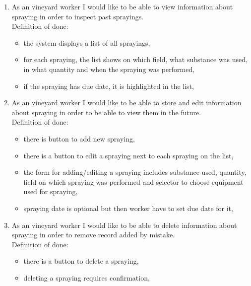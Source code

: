 \begin{enumerate}
	\begin{itemize}
		\item on task list there is button to mark task as completed or not completed,
	\end{itemize}
	\item As an vineyard worker I would like to be able to view information about spraying in order to inspect past sprayings. \\Definition of done:
	\begin{itemize}
		\item the system displays a list of all sprayings,
		\item for each spraying, the list shows on which field, what substance was used, in what quantity and when the spraying was performed,
		\item if the spraying has due date, it is highlighted in the list,
	\end{itemize}
	\item As an vineyard worker I would like to be able to store and edit information about spraying in order to be able to view them in the future. \\Definition of done:
	\begin{itemize}
		\item there is button to add new spraying,
		\item there is a button to edit a spraying next to each spraying on the list,
		\item the form for adding/editing a spraying includes substance used, quantity, field on which spraying was performed and selector to choose equipment used for spraying,
		\item spraying date is optional but then worker have to set due date for it,
	\end{itemize}
	\item As an vineyard worker I would like to be able to delete information about spraying in order to remove record added by mistake. \\Definition of done:
	\begin{itemize}
		\item there is a button to delete a spraying,
		\item deleting a spraying requires confirmation,
	\end{itemize}

\end{enumerate}
